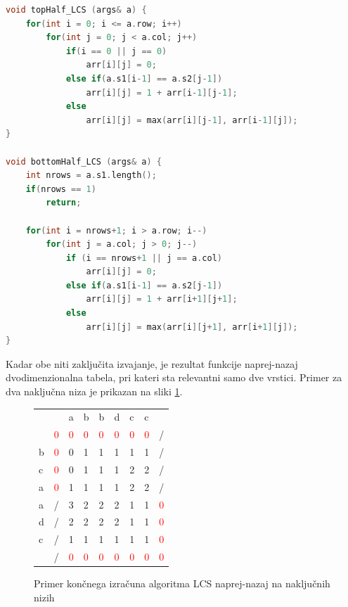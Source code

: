 \documentclass[a4paper,12pt,openright]{book}
\begin{document}
\bigskip
\begin{lstlisting}[language=C++, caption={Funkciji za računanje zgornje in spodnje polovice tabele za LCS}, captionpos=b, label=fbLCSthreads]
void topHalf_LCS (args& a) {
    for(int i = 0; i <= a.row; i++) 
        for(int j = 0; j < a.col; j++)
            if(i == 0 || j == 0)
                arr[i][j] = 0;        
            else if(a.s1[i-1] == a.s2[j-1])
                arr[i][j] = 1 + arr[i-1][j-1];
            else 
                arr[i][j] = max(arr[i][j-1], arr[i-1][j]);
}

void bottomHalf_LCS (args& a) {
    int nrows = a.s1.length();
    if(nrows == 1)
        return;

    for(int i = nrows+1; i > a.row; i--) 
        for(int j = a.col; j > 0; j--) 
            if (i == nrows+1 || j == a.col) 
                arr[i][j] = 0;
            else if(a.s1[i-1] == a.s2[j-1])
                arr[i][j] = 1 + arr[i+1][j+1];
            else
                arr[i][j] = max(arr[i][j+1], arr[i+1][j]);
}
\end{lstlisting}

Kadar obe niti zaključita izvajanje, je rezultat funkcije naprej-nazaj dvodimenzionalna tabela, pri kateri sta relevantni samo dve vrstici. Primer za dva naključna niza je prikazan na sliki \ref{fbLCSresult}.

\begin{figure}[htb]
\centering
\begin{tabular}{|l|l|l|l|l|l|l|l|l|}
\cline{3-8}
  \multicolumn{2}{c|}{}  & a & b & b & d & c & c & \multicolumn{1}{|c}{} \\ \cline{2-9}
 \multicolumn{1}{c|}{} & \textcolor{red}{0} & \textcolor{red}{0} & \textcolor{red}{0} & \textcolor{red}{0} & \textcolor{red}{0} & \textcolor{red}{0} & \textcolor{red}{0} & / \\ \hline
b  & \textcolor{red}{0}  & 0 & 1 & 1 & 1 & 1 & 1 & / \\ \hline
c  & \textcolor{red}{0} & 0 & 1 & 1 & 1 & 2 & 2 & / \\ \hline
a  & \textcolor{red}{0} & \cellcolor{blue!15}1 & \cellcolor{blue!15}1 & \cellcolor{blue!15}1 & \cellcolor{blue!15}1 & \cellcolor{blue!15}2 & \cellcolor{blue!15}2 & / \\ \hline
a  & / & \cellcolor{blue!15}3  & \cellcolor{blue!15}2 &  \cellcolor{blue!15}2 & \cellcolor{blue!15}2 & \cellcolor{blue!15}1 & \cellcolor{blue!15}1 & \textcolor{red}{0} \\ \hline
d  & / & 2 & 2 & 2 & 2 & 1 & 1 & \textcolor{red}{0} \\ \hline
c  & / & 1 & 1 & 1 & 1 & 1 & 1 & \textcolor{red}{0} \\ \hline
\multicolumn{1}{c|}{}  & / & \textcolor{red}{0} & \textcolor{red}{0} & \textcolor{red}{0} & \textcolor{red}{0} & \textcolor{red}{0} & \textcolor{red}{0} & \textcolor{red}{0} \\ \cline{2-9}
\end{tabular}
\caption{Primer končnega izračuna algoritma LCS naprej-nazaj na naključnih nizih}
\label{fbLCSresult}
\end{figure}
\end{document}
